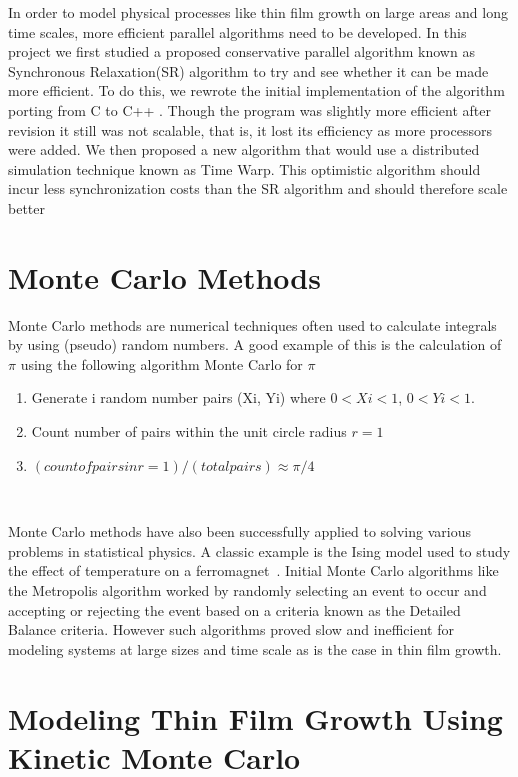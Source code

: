 
	In order to model physical processes like thin film growth on large areas and long  time scales, more efficient parallel algorithms need to be developed. In this project we first studied a proposed conservative parallel algorithm known as Synchronous Relaxation(SR) algorithm to try and see whether it can be made more efficient. To do this, we rewrote the initial implementation of the algorithm porting from C to C++ . Though the program was slightly more efficient after revision it still was not scalable, that is, it lost its efficiency as more processors were added.
	We then proposed a  new algorithm that would use a distributed simulation technique known as Time Warp. This optimistic algorithm should incur less synchronization costs  than the SR algorithm and should therefore scale better

\section{Monte Carlo Methods}

Monte Carlo methods are numerical techniques often used to calculate integrals by using (pseudo) random  numbers. A good example of this is the calculation of $\pi$ using the following algorithm
  	Monte Carlo for $\pi$
\begin{enumerate}
\item Generate i random number pairs (Xi, Yi) where $0<Xi<1$, $0<Yi<1$.
\item Count number of pairs within the unit circle radius $r=1$
\item $(count of pairs in r=1)/(total pairs) \approx \pi/4$
\end{enumerate}~\cite{ysja:sr}

Monte Carlo methods have also been successfully applied to solving various problems in statistical physics. A classic example is the Ising model used to study the effect of temperature on a ferromagnet~\cite{ae:kmc}.  Initial Monte Carlo algorithms like the Metropolis algorithm worked by randomly selecting an event to occur and accepting or rejecting the event based on a criteria known as the Detailed Balance criteria. However such algorithms proved slow and inefficient for modeling systems at large sizes and time scale as is the case in thin film growth.

\section{Modeling Thin Film Growth Using Kinetic Monte Carlo}

